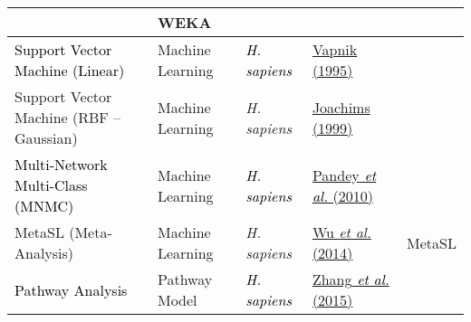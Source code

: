 \begin{flushleft}
\begin{supertabular}{m{4.421cm}|m{2.342cm}|m{2.388cm}|m{4.552cm}|m{2.299cm}}
~
 &
WEKA\\\hline
{}\color{black}
\textcolor{black}{Support Vector Machine (Linear)} &
\color{black} Machine
Learning &
\color{black}
\textit{\textcolor{black}{H. sapiens}} &
\color{black}
\hyperlink{ENREF106}{Vapnik (1995)} &
~
\\\hline
Support Vector Machine (RBF -- Gaussian) &
Machine Learning &
\textit{H. sapiens} &
\hyperlink{ENREF54}{Joachims (1999)} &
~
\\\hline
{}\color{black}
\textcolor{black}{Multi-Network Multi-Class (MNMC)} &
\color{black} Machine
Learning &
\color{black}
\textit{\textcolor{black}{H. sapiens}} &
\color{black}
\hyperlink{ENREF79}{Pandey}\hyperlink{ENREF79}{\textit{\textcolor{black}{
et al.}}}\hyperlink{ENREF79}{ (2010)} &
~
\\\hline
MetaSL (Meta-Analysis) &
Machine Learning &
\textit{H. sapiens} &
\hyperlink{ENREF114}{Wu}\hyperlink{ENREF114}{\textit{ et
al.}}\hyperlink{ENREF114}{ (2014)} &
MetaSL\\\hline
{}\color{black}
\textcolor{black}{Pathway Analysis} &
\color{black} Pathway
Model &
\color{black}
\textit{\textcolor{black}{H. sapiens}} &
\color{black}
\hyperlink{ENREF117}{Zhang}\hyperlink{ENREF117}{\textit{\textcolor{black}{
et al.}}}\hyperlink{ENREF117}{ (2015)} &
~
\\\hline
\end{supertabular}
\end{flushleft}

